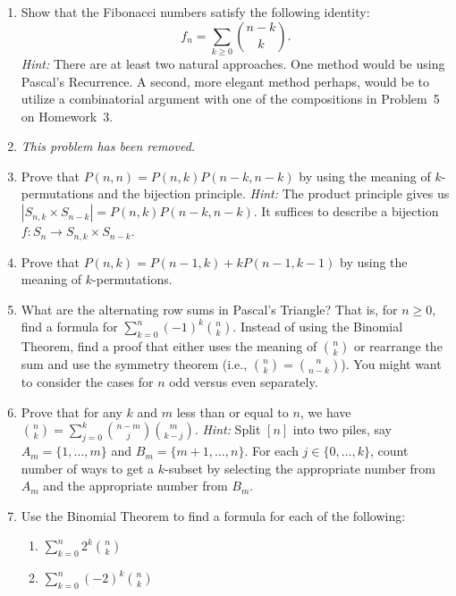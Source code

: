 \documentclass[11pt]{article}%
\theoremstyle{definition}
\begin{document}
\begin{enumerate}
\item Show that the Fibonacci numbers satisfy the following identity:
\[
f_n = \sum_{k\geq 0} \binom{n-k}{k}.
\]
\emph{Hint:} There are at least two natural approaches.  One method would be using Pascal's Recurrence.  A second, more elegant method perhaps, would be to utilize a combinatorial argument with one of the compositions in Problem~5 on Homework~3.
\item  \emph{This problem has been removed.}%
\item Prove that $P(n,n) = P(n,k)P(n-k,n-k)$ by using the meaning of $k$-permutations and the bijection principle. \emph{Hint:} The product principle gives us $|S_{n,k}\times S_{n-k}|=P(n,k)P(n-k,n-k)$. It suffices to describe a bijection
$f: S_n \to S_{n,k} \times S_{n-k}$.
\item Prove that $P(n,k)=P(n-1,k)+kP(n-1,k-1)$ by using the meaning of $k$-permutations.
\item What are the alternating row sums in Pascal's Triangle?  That is, for $n\geq 0$, find a formula for $\sum_{k=0}^{n}(-1)^k\binom{n}{k}$. Instead of using the Binomial Theorem, find a proof that either uses the meaning of $\binom{n}{k}$ or rearrange the sum and use the symmetry theorem (i.e., $\binom{n}{k}=\binom{n}{n-k}$). You might want to consider the cases for $n$ odd versus even separately.
\item Prove that for any $k$ and $m$ less than or equal to $n$, we have $\binom{n}{k}=\sum_{j=0}^k\binom{n-m}{j}\binom{m}{k-j}$. \textit{Hint:} Split $[n]$ into two piles, say $A_m=\{1,\ldots,m\}$ and $B_m=\{m+1,\ldots,n\}$. For each $j\in\{0,\ldots, k\}$, count number of ways to get a $k$-subset by selecting the appropriate number from $A_m$ and the appropriate number from $B_m$.
\item Use the Binomial Theorem to find a formula for each of the following:
\begin{enumerate}
\item $\displaystyle \sum_{k=0}^n2^k\binom{n}{k}$
\item $\displaystyle \sum_{k=0}^n(-2)^k\binom{n}{k}$
\end{enumerate}
\end{enumerate}
\end{document}

